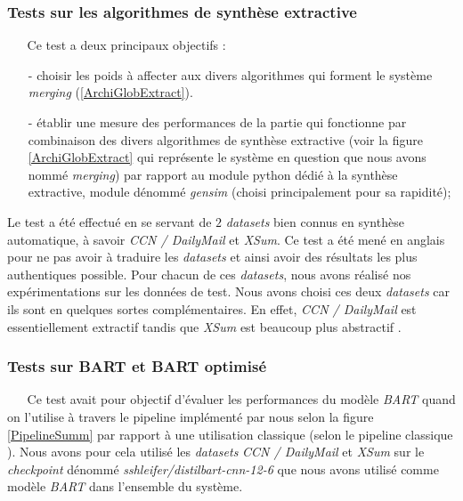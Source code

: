 \subsubsection{Tests sur les algorithmes de synthèse extractive}
$ _{} $ $ _{} $ $ _{} $ $ _{} $ $ _{} $Ce test a deux principaux objectifs :
\begin{itemize}
\item[-] choisir les poids à affecter aux divers algorithmes qui forment le système \textit{merging} (\ref{ArchiGlobExtract}).
\item[-] établir une mesure des performances de la partie qui fonctionne par combinaison des divers algorithmes de synthèse extractive (voir la figure \ref{ArchiGlobExtract} qui représente le système en question que nous avons nommé \textit{merging}) par rapport au module python dédié à la synthèse extractive, module dénommé \textit{gensim} (choisi principalement pour sa rapidité);
\end{itemize}
Le test a été effectué en se servant de $ 2 $ \textit{datasets} bien connus en synthèse automatique, à savoir \textit{CCN / DailyMail} et \textit{XSum}. Ce test a été mené en anglais pour ne pas avoir à traduire les \textit{datasets} et ainsi avoir des résultats les plus authentiques possible. Pour chacun de ces \textit{datasets}, nous avons réalisé nos expérimentations sur les données de test. Nous avons choisi ces deux \textit{datasets} car ils sont en quelques sortes complémentaires. En effet, \textit{CCN / DailyMail} est essentiellement extractif tandis que \textit{XSum} est beaucoup plus abstractif \cite{eddine2020barthez}.
\subsubsection{Tests sur BART et BART optimisé}
$ _{} $ $ _{} $ $ _{} $ $ _{} $ $ _{} $Ce test avait pour objectif d'évaluer les performances du modèle \textit{BART} quand on l'utilise à travers le pipeline implémenté par nous selon la figure \ref{PipelineSumm} par rapport à une utilisation classique (selon le pipeline classique \cite{GRAAL_HF_tunstall2022natural}). Nous avons pour cela utilisé les \textit{datasets}
\textit{CCN / DailyMail} et \textit{XSum} sur le \textit{checkpoint} dénommé \textit{sshleifer/distilbart-cnn-12-6} que nous avons utilisé comme modèle \textit{BART} dans l'ensemble du système. 
